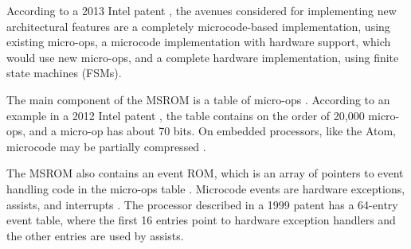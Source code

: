 According to a 2013 Intel patent \cite{intel2013scattergather}, the avenues
considered for implementing new architectural features are a completely
microcode-based implementation, using existing micro-ops, a microcode
implementation with hardware support, which would use new micro-ops, and a
complete hardware implementation, using finite state machines (FSMs).


The main component of the MSROM is a table of micro-ops \cite{intel2008genetic,
intel2012clusters}. According to an example in a 2012 Intel patent
\cite{intel2012clusters}, the table contains on the order of 20,000 micro-ops,
and a micro-op has about 70 bits. On embedded processors, like the Atom,
microcode may be partially compressed
\cite{intel2008genetic, intel2012clusters}.


The MSROM also contains an event ROM, which is an array of pointers to event
handling code in the micro-ops table \cite{intel1999events}. Microcode events
are hardware exceptions, assists, and interrupts \cite{intel1997events,
intel1999exceptions, intel2007microstack}. The processor described in a 1999
patent \cite{intel1999events} has a 64-entry event table, where the first 16
entries point to hardware exception handlers and the other entries are used by
assists.


